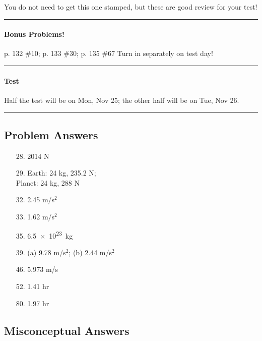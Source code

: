 \documentclass[10pt]{exam}
\begin{document}
{\sc You do not need to get this one stamped,
but these are good review for your test!}

\vspace{1em}
\hrule


\paragraph{Bonus Problems!} p. 132 \#10; p. 133 \#30; p. 135 \#67
\dotfill Turn in separately on test day!

\vspace{1em}
\hrule



\paragraph{Test} Half the test will be on Mon, Nov 25; the other half will be on Tue, Nov 26.

\vspace{1em}

\hrule

\subsection*{Problem Answers}

\begin{multicols}{3}

  \begin{itemize}[noitemsep]
    \item[28.] 2014 N
    \item[29.] Earth: 24 kg, 235.2 N; \\ Planet: 24 kg, 288 N
    \item[32.] 2.45 m/s$^2$
    \item[33.] 1.62 m/s$^2$
    \item[35.] \SI{6.5e23}{\kilo\gram}
    \item[39.] (a) 9.78 m/s$^2$;  (b) 2.44 m/s$^2$
    \item[46.] 5,973 m/s
    \item[52.] 1.41 hr
    \item[80.] 1.97 hr
    
  \end{itemize}
  
\end{multicols}

\subsection*{Misconceptual Answers}
\end{document}
